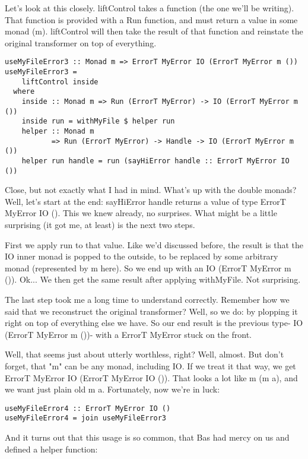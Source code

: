 Let's look at this closely. liftControl takes a function (the one we'll be writing). That function is provided with a Run function, and must return a value in some monad (m). liftControl will then take the result of that function and reinstate the original transformer on top of everything.

\begin{lstlisting}
useMyFileError3 :: Monad m => ErrorT MyError IO (ErrorT MyError m ())
useMyFileError3 =
    liftControl inside
  where
    inside :: Monad m => Run (ErrorT MyError) -> IO (ErrorT MyError m ())
    inside run = withMyFile $ helper run
    helper :: Monad m
           => Run (ErrorT MyError) -> Handle -> IO (ErrorT MyError m ())
    helper run handle = run (sayHiError handle :: ErrorT MyError IO ())
\end{lstlisting}

Close, but not exactly what I had in mind. What's up with the double monads? Well, let's start at the end: sayHiError handle returns a value of type ErrorT MyError IO (). This we knew already, no surprises. What might be a little surprising (it got me, at least) is the next two steps.

First we apply run to that value. Like we'd discussed before, the result is that the IO inner monad is popped to the outside, to be replaced by some arbitrary monad (represented by m here). So we end up with an IO (ErrorT MyError m ()). Ok... We then get the same result after applying withMyFile. Not surprising.

The last step took me a long time to understand correctly. Remember how we said that we reconstruct the original transformer? Well, so we do: by plopping it right on top of everything else we have. So our end result is the previous type- IO (ErrorT MyError m ())- with a ErrorT MyError stuck on the front.

Well, that seems just about utterly worthless, right? Well, almost. But don't forget, that "m" can be any monad, including IO. If we treat it that way, we get ErrorT MyError IO (ErrorT MyError IO ()). That looks a lot like m (m a), and we want just plain old m a. Fortunately, now we're in luck:

\begin{lstlisting}
useMyFileError4 :: ErrorT MyError IO ()
useMyFileError4 = join useMyFileError3
\end{lstlisting}

And it turns out that this usage is so common, that Bas had mercy on us and defined a helper function:

